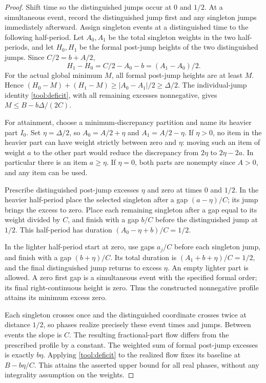 \documentclass[11pt,a4paper]{article}
\theoremstyle{remark}\newtheorem{remark}[theorem]{Remark}
\begin{document}
\begin{proof}
Shift time so the distinguished jumps occur at $0$ and $1/2$.
At a simultaneous event, record the distinguished jump first and
any singleton jumps immediately afterward. Assign singleton events
at a distinguished time to the following half-period. Let $A_0,A_1$
be the total singleton weights in the two half-periods, and let
$H_0,H_1$ be the formal post-jump heights of the two distinguished
jumps. Since $C/2=b+A/2$,
\[
 H_1-H_0=C/2-A_0-b=(A_1-A_0)/2.
\]
For the actual global minimum $M$, all formal post-jump heights
are at least $M$. Hence
$(H_0-M)+(H_1-M)\ge|A_0-A_1|/2\ge\Delta/2$.
The individual-jump identity \eqref{tool:deficit}, with all remaining
excesses nonnegative, gives $M\le B-b\Delta/(2C)$.

For attainment, choose a minimum-discrepancy partition and name its
heavier part $I_0$. Set $\eta=\Delta/2$, so
$A_0=A/2+\eta$ and $A_1=A/2-\eta$. If $\eta>0$, no item in the
heavier part can have weight strictly between zero and $\eta$:
moving such an item of weight $a$ to the other part would reduce
the discrepancy from $2\eta$ to $2\eta-2a$. In particular there is
an item $a\ge\eta$. If $\eta=0$, both parts are nonempty since
$A>0$, and any item can be used.

Prescribe distinguished post-jump excesses $\eta$ and zero at
times $0$ and $1/2$. In the heavier half-period place the selected
singleton after a gap $(a-\eta)/C$; its jump brings the excess to
zero. Place each remaining singleton after a gap equal to its
weight divided by $C$, and finish with a gap $b/C$ before the
distinguished jump at $1/2$. This half-period has duration
$(A_0-\eta+b)/C=1/2$.

In the lighter half-period start at zero, use gaps $a_j/C$ before
each singleton jump, and finish with a gap $(b+\eta)/C$. Its total
duration is $(A_1+b+\eta)/C=1/2$, and the final distinguished jump
returns to excess $\eta$. An empty lighter part is allowed. A zero
first gap is a simultaneous event with the specified formal order;
its final right-continuous height is zero. Thus the constructed
nonnegative profile attains its minimum excess zero.

Each singleton crosses once and the distinguished coordinate crosses
twice at distance $1/2$, so phases realize precisely these event
times and jumps. Between events the slope is $C$. The resulting
fractional-part flow differs from the prescribed profile by a constant.
The weighted sum of formal post-jump excesses is exactly $b\eta$.
Applying \eqref{tool:deficit} to the realized flow fixes its baseline
at $B-b\eta/C$. This attains the asserted upper bound for all real
phases, without any integrality assumption on the weights.
\end{proof}
\end{document}
